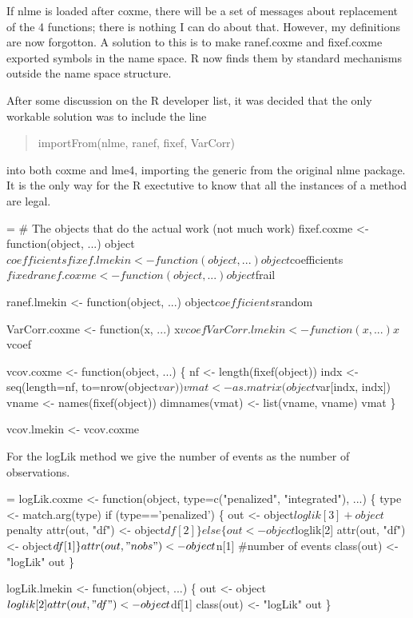 \documentclass{article}
\begin{document}
If nlme is loaded after coxme, there will be a set of messages about
replacement of the 4 functions; there is nothing I can do about
that.  
However, my definitions are now forgotton.  A solution to this is to
make ranef.coxme and fixef.coxme exported symbols in the name space.
R now finds them by standard mechanisms outside the name space structure.

After some discussion on the R developer list, it was decided that the
only workable solution was to include the line
\begin{quote}
   importFrom(nlme, ranef, fixef, VarCorr)
\end{quote}
into both coxme and lme4, importing the generic from the original nlme
package.  It is the only way for the R exectutive to know that all the
instances of a method are legal.

\begin{nwchunk}
=
 # The objects that do the actual work (not much work)
 fixef.coxme <- function(object, ...)
     object$coefficients
 
 fixef.lmekin <- function(object, ...)
     object$coefficients$fixed
 
 ranef.coxme <- function(object, ...)
     object$frail
 
 ranef.lmekin <- function(object, ...)
     object$coefficients$random
 
 VarCorr.coxme <- function(x, ...) 
     x$vcoef
     
 VarCorr.lmekin <- function(x, ...) 
     x$vcoef
 
 vcov.coxme <- function(object, ...) \{
     nf <- length(fixef(object))
     indx <- seq(length=nf, to=nrow(object$var))
     vmat <- as.matrix(object$var[indx, indx])
     vname <- names(fixef(object))
     dimnames(vmat) <- list(vname, vname)
     vmat
 \}
 
 vcov.lmekin <- vcov.coxme  
\end{nwchunk}

For the logLik method we give the number of events as the number of
observations.  
\begin{nwchunk}
=
 logLik.coxme <- function(object, type=c("penalized", "integrated"), ...) \{
     type <- match.arg(type)
     if (type=='penalized') \{
         out <- object$loglik[3] + object$penalty
         attr(out, "df") <- object$df[2]
         \}
     else \{
         out <- object$loglik[2]
         attr(out, "df") <- object$df[1]
         \}
     attr(out, "nobs") <- object$n[1]  #number of events
     class(out) <- "logLik"
     out
 \}
 
 logLik.lmekin <- function(object, ...) \{
     out <- object$loglik[2]
     attr(out, "df") <- object$df[1]
     class(out) <- "logLik"
     out
     \}
\end{nwchunk}
\end{document}
